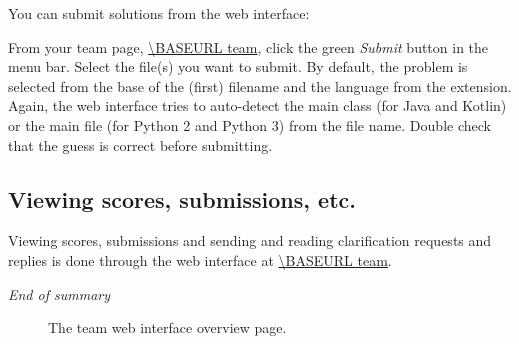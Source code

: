 You can submit solutions%
from the web interface:
\begin{description}[\breaklabel\setlabelstyle{\bfseries}]
\item[Web interface]
From your team page, \url{\BASEURL team}, click the green \emph{Submit} button
in the menu bar. Select the file(s) you want to submit.
By default, the problem is selected from the base of the (first)
filename and the language from the extension. Again, the web interface tries
to auto-detect the main class (for Java and Kotlin) or the main file (for
Python 2 and Python 3) from the file name. Double check that the guess is
correct before submitting.
\end{description}

\subsection*{Viewing scores, submissions, etc.}

Viewing scores, submissions and sending and reading clarification
requests and replies is done through the web interface at
\url{\BASEURL team}.

\emph{End of summary}

\begin{figure}[p]
  \centering
  \caption{The team web interface overview page.}
  \label{fig:team-overview}
\end{figure}

